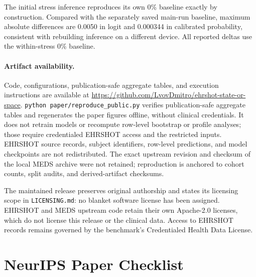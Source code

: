 \documentclass{article}
\begin{document}
\FloatBarrier

The initial stress inference reproduces its own 0\% baseline exactly by
construction. Compared with the separately saved main-run baseline, maximum
absolute differences are 0.0050 in logit and 0.000344 in calibrated
probability, consistent with rebuilding inference on a different device. All
reported deltas use the within-stress 0\% baseline.

\paragraph{Artifact availability.}
Code, configurations, publication-safe aggregate tables, and execution
instructions are available at
\url{https://github.com/LvovDmitro/ehrshot-state-or-space}.
\texttt{python paper/reproduce\_public.py} verifies publication-safe aggregate
tables and regenerates the paper figures offline, without clinical credentials.
It does not retrain models or recompute row-level bootstrap or profile analyses;
those require credentialed EHRSHOT access and the restricted inputs. EHRSHOT
source records, subject identifiers, row-level predictions, and model checkpoints
are not redistributed. The exact upstream revision and checksum of the local
MEDS archive were not retained; reproduction is anchored to cohort counts,
split audits, and derived-artifact checksums.

The maintained release preserves original authorship and states its licensing
scope in \texttt{LICENSING.md}: no blanket software license has been assigned.
EHRSHOT and MEDS upstream code retain their own Apache-2.0 licenses, which do
not license this release or the clinical data. Access to EHRSHOT records remains
governed by the benchmark's Credentialed Health Data License.

\section*{NeurIPS Paper Checklist}
\end{document}
